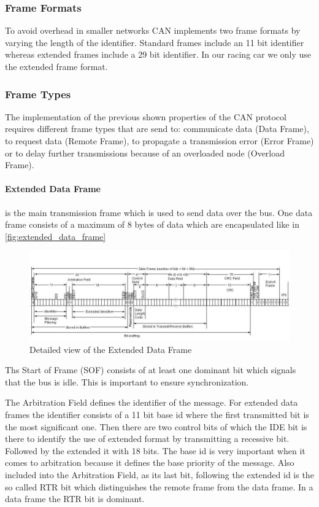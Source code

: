 	\subsubsection{Frame Formats}
	To avoid overhead in smaller networks CAN implements two frame formats by
	varying the length of the identifier. Standard frames include an 11 bit
	identifier whereas extended frames include a 29 bit identifier. In our racing
	car we only use the extended frame format.
	\subsubsection{Frame Types}
	The implementation of the previous shown properties of the CAN protocol
	requires different frame types that are send to: communicate data (Data Frame),
	to request data (Remote Frame), to propagate a transmission error (Error Frame) or
	to delay further transmissions because of an overloaded node (Overload Frame).
	
	\paragraph{Extended Data Frame} is the main transmission frame which is used to
	send data over the bus. One data frame consists of a maximum of 8 bytes of data which are
	encapsulated like in \autoref{fig:extended_data_frame}
	
	\begin{figure}[htb] \centering
		\includegraphics[width=1\textwidth]{content/pictures/EDF}
		\caption{Detailed view of the Extended Data Frame}
		\label{fig:extended_data_frame}
	\end{figure}
	
	Ths Start of Frame (SOF) consists of at least one dominant bit which signals
	that the bus is idle. This is important to ensure synchronization.
	
	The Arbitration Field defines the identifier of the message. For extended data
	frames the identifier consists of a 11 bit base id where the first transmitted
	bit is the most significant one. Then there are two control bits of which the
	IDE bit is there to identify the use of extended format by transmitting a
	recessive bit. Followed by the extended it with 18 bits. The base id is very
	important when it comes to arbitration because it defines the base priority of
	the message.
	Also included into the Arbitration Field, as its last bit, following the
	extended id is the so called RTR bit which distinguishes the remote frame from the data
	frame. In a data frame the RTR bit is dominant.
	
